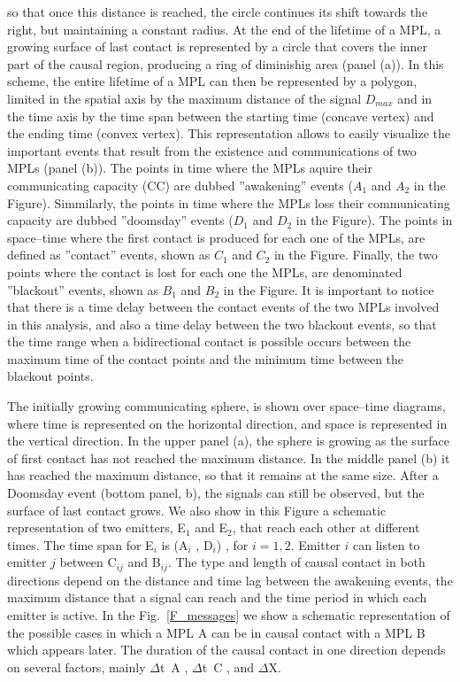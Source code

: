 so that once this distance is reached, the circle continues its shift
towards the right, but maintaining a constant radius.
%
At the end of the lifetime of a MPL, a growing surface of last
contact is represented by a circle that covers the inner part of the
causal region, producing a ring of diminishig area (panel (a)).
%
In this scheme, the entire lifetime of a MPL can then be represented
by a polygon, limited in the spatial axis by the maximum distance of
the signal $D_{max}$ and in the time axis by the time span between the
starting time (concave vertex) and the ending time (convex vertex).
%
This representation allows to easily visualize the important events
that result from the existence and communications of two MPLs (panel
(b)).
%
The points in time where the MPLs aquire their communicating capacity
(CC) are dubbed ''awakening'' events ($A_1$ and $A_2$ in the Figure).
%
Simmilarly, the points in time where the MPLs loss their
communicating capacity are dubbed ''doomsday'' events ($D_1$ and $D_2$
in the Figure).
%
The points in space--time where the first contact is produced for each
one of the MPLs, are defined as ''contact'' events, shown as $C_1$
and $C_2$ in the Figure.
%
Finally, the two points where the contact is lost for each one the
MPLs, are denominated ''blackout'' events, shown as $B_1$ and $B_2$
in the Figure.
%
It is important to notice that there is a time delay between the
contact events of the two MPLs involved in this analysis, and also a
time delay between the two blackout events, so that the time range
when a bidirectional contact is possible occurs between the maximum
time of the contact points and the minimum time between the blackout
points.




The initially growing communicating sphere, is shown over
space--time diagrams, where time is represented on the horizontal
direction, and space is represented in the vertical direction.
%
In the upper panel (a), the sphere is growing as the surface of first
contact has not reached the maximum distance.
%
In the middle panel (b) it has reached the maximum distance, so that
it remains at the same size.
%
After a Doomsday event (bottom panel, b), the signals can still be
observed, but the surface of last contact grows.
%
We also show in this Figure a schematic representation of two
emitters, E$_1$ and E$_2$, that reach each other at different times.
%
The time span for E$_i$ is (A$_i$ , D$_i$) , for $i = {1, 2}$.
%
Emitter $i$ can listen to emitter $j$ between C$_{ij}$ and B$_{ij}$.
%
The type and length of causal contact in both directions depend on the
distance and time lag between the awakening events, the maximum
distance that a signal can reach and the time period in which each
emitter is active.
%
In the Fig.~\ref{F_messages} we show a schematic representation of the
possible cases in which a MPL A can be in causal contact with a MPL
B which appears later.
%
The duration of the causal contact in one direction depends on several
factors, mainly $\Delta$t~A , $\Delta$t~C , and $\Delta$X.


